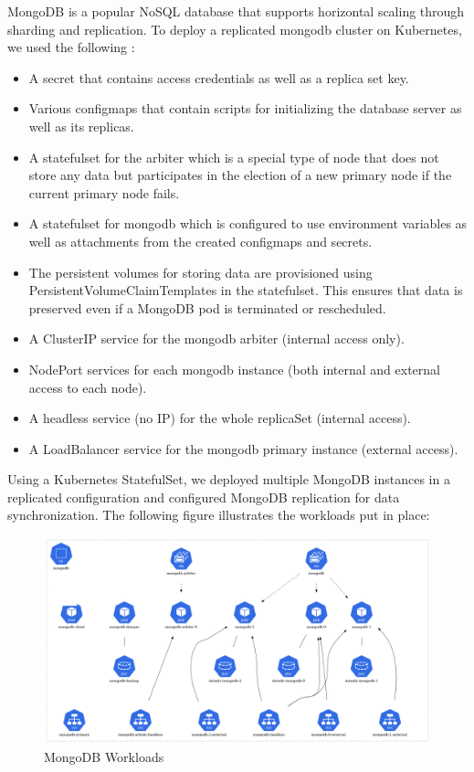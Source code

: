 
MongoDB is a popular NoSQL database that supports horizontal scaling through sharding and replication. To deploy a replicated mongodb cluster on Kubernetes, we used the following : 
\begin{itemize}[label={--}]
\item A secret that contains access credentials as well as a replica set key. 
\item Various configmaps that contain scripts for initializing the database server as well as its replicas. 
\item A statefulset for the arbiter which is a special type of node that does not store any data but participates in the election of a new primary node if the current primary node fails. 
\item A statefulset for mongodb which is configured to use environment variables as well as attachments from the created configmaps and secrets. 
\item The persistent volumes for storing data are provisioned using PersistentVolumeClaimTemplates in the statefulset. This ensures that data is preserved even if a MongoDB pod is terminated or rescheduled. 
\item A ClusterIP service for the mongodb arbiter (internal access only). 
\item NodePort services for each mongodb instance (both internal and external access to each node). 
\item A headless service (no IP) for the whole replicaSet (internal access). 
\item A LoadBalancer service for the mongodb primary instance (external access). 
\end{itemize}

Using a Kubernetes StatefulSet, we deployed multiple MongoDB instances in a replicated configuration and configured MongoDB replication for data synchronization. The following figure illustrates the workloads put in place: 


\begin{figure}[H]\centering
\includegraphics[width=1.0\textwidth,angle=00]{assets/f36.png}
\caption{MongoDB Workloads }
\label{fig:MongoDB Workloads}
\end{figure}

